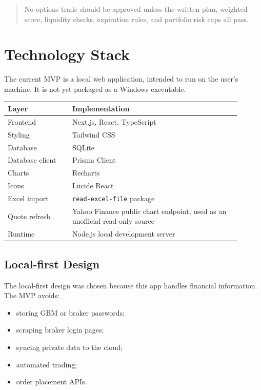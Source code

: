 \documentclass[11pt]{article}
\begin{document}
\begin{quote}
No options trade should be approved unless the written plan, weighted score, liquidity checks, expiration rules, and portfolio risk caps all pass.
\end{quote}

\section{Technology Stack}

The current MVP is a local web application, intended to run on the user's machine. It is not yet packaged as a Windows executable.

\begin{longtable}{p{0.25\linewidth} p{0.65\linewidth}}
\toprule
\textbf{Layer} & \textbf{Implementation} \\
\midrule
Frontend & Next.js, React, TypeScript \\
Styling & Tailwind CSS \\
Database & SQLite \\
Database client & Prisma Client \\
Charts & Recharts \\
Icons & Lucide React \\
Excel import & \texttt{read-excel-file} package \\
Quote refresh & Yahoo Finance public chart endpoint, used as an unofficial read-only source \\
Runtime & Node.js local development server \\
\bottomrule
\end{longtable}

\subsection{Local-first Design}

The local-first design was chosen because this app handles financial information. The MVP avoids:

\begin{itemize}[noitemsep]
  \item storing GBM or broker passwords;
  \item scraping broker login pages;
  \item syncing private data to the cloud;
  \item automated trading;
  \item order placement APIs.
\end{itemize}
\end{document}
